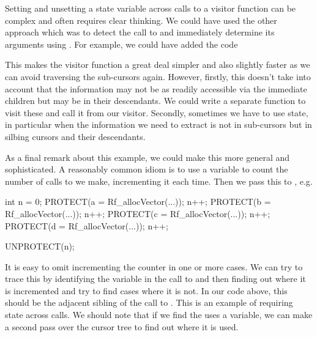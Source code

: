 Setting and unsetting a state variable across calls to a visitor
function can be complex and often requires clear thinking.
We could have used the other approach which was to detect
the call to  and immediately determine its arguments
using . For example, we could have added the code
This makes the visitor function a great deal simpler and also slightly
faster as we can avoid traversing the sub-cursors again.  However,
firstly, this doesn't take into account that the information may not
be as readily accessible via the immediate children but may be in
their descendants.  We could write a separate function to visit these
and call it from our visitor.  Secondly, sometimes we have to use
state, in particular when the information we need to extract is not in
sub-cursors but in silbing cursors and their descendants.


As a final remark about this example, we could make this more general
and sophisticated.  A reasonably common idiom is to use a variable to
count the number of calls to  we make, incrementing it
each time. Then we pass this to , e.g.
\begin{CCode}
 int n = 0;
 PROTECT(a = Rf_allocVector(...)); n++;
 PROTECT(b = Rf_allocVector(...)); n++;
 PROTECT(c = Rf_allocVector(...)); n++;
 PROTECT(d = Rf_allocVector(...)); n++;

 UNPROTECT(n);
\end{CCode}
It is easy to omit incrementing the counter in one or more cases. We
can try to trace this by identifying the variable in the call to
 and then finding out where it is incremented and try
to find cases where it is not.  In our code above, this should be the
adjacent sibling of the call to . This is an example of
requiring state across calls.  We should note that if we find the
 uses a variable, we can make a second pass over the
cursor tree to find out where it is used.



